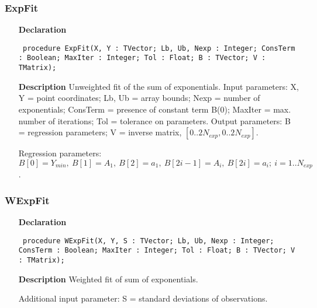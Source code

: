 \documentclass[12pt,a4paper,oneside]{report}
\newcommand{\declarationitem}[1]{\textbf{#1}}
\newcommand{\descriptiontitle}[1]{\textbf{#1}}
\newcommand{\code}[1]{\texttt{#1}}
\begin{document}
\subsubsection{ExpFit}
\label{uexpfit-ExpFit}
\begin{itemize}\item[\declarationitem{Declaration}\hfill]
	\begin{flushleft}
		\code{
			procedure ExpFit(X, Y : TVector; Lb, Ub, Nexp : Integer; ConsTerm : Boolean; MaxIter : Integer; Tol : Float; B : TVector; V : TMatrix);}
		
	\end{flushleft}
	
	\par
	\item[\descriptiontitle{Description}]
	Unweighted fit of the sum of exponentials. Input parameters: X, Y = point coordinates; Lb, Ub = array bounds; Nexp = number of exponentials; ConsTerm = presence of constant term B(0); MaxIter = max. number of iterations; Tol = tolerance on parameters. Output parameters: B = regression parameters; V = inverse matrix, $[0..2N_{exp},0..2N_{exp}]$.
	
	Regression parameters: $B[0] = Y_{min},\	B[1] = A_1,\ B[2] = a_1,\ B[2 i-1] = A_i,\ B[2 i] = a_i;\ i = 1..N_{exp}$.
	
	
\end{itemize}
\subsubsection{WExpFit}
\label{uexpfit-WExpFit}
\begin{itemize}\item[\declarationitem{Declaration}\hfill]
	\begin{flushleft}
		\code{
			procedure WExpFit(X, Y, S : TVector; Lb, Ub, Nexp : Integer; ConsTerm : Boolean; MaxIter : Integer; Tol : Float; B : TVector; V : TMatrix);}
		
	\end{flushleft}
	
	\par
	\item[\descriptiontitle{Description}]
	Weighted fit of sum of exponentials.
	
	Additional input parameter: S = standard deviations of observations.
	
\end{itemize}
\end{document}
